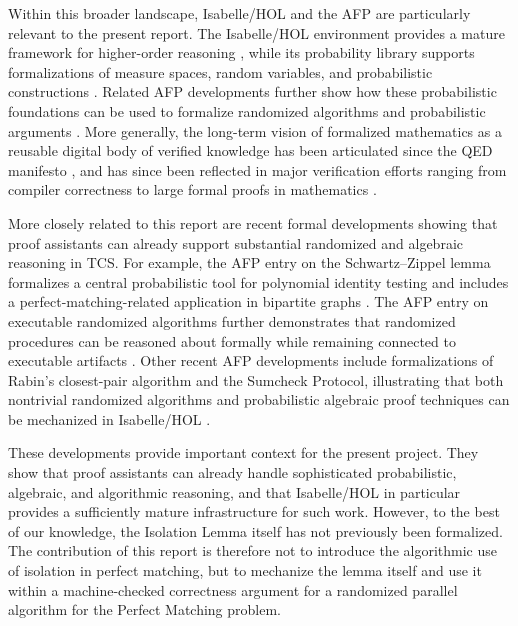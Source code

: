 Within this broader landscape, Isabelle/HOL and the AFP are particularly relevant to the present report.
The Isabelle/HOL environment provides a mature framework for higher-order reasoning \cite{nipkow2002isabelle}, while its probability library supports formalizations of measure spaces, random variables, and probabilistic constructions \cite{isabelleprob}. 
Related AFP developments further show how these probabilistic foundations can be used to formalize randomized algorithms and probabilistic arguments \cite{Executable_Randomized_Algorithms-AFP}.
More generally, the long-term vision of formalized mathematics as a reusable digital body of verified knowledge has been articulated since the QED manifesto \cite{qed1994}, and has since been reflected in major verification efforts ranging from compiler correctness to large formal proofs in mathematics \cite{leroy2009compcert,gonthier2005fourcolour}.

More closely related to this report are recent formal developments showing that proof assistants can already support substantial randomized and algebraic reasoning in TCS.
For example, the AFP entry on the Schwartz--Zippel lemma formalizes a central probabilistic tool for polynomial identity testing and includes a perfect-matching-related application in bipartite graphs \cite{Schwartz_Zippel-AFP}.
The AFP entry on executable randomized algorithms further demonstrates that randomized procedures can be reasoned about formally while remaining connected to executable artifacts \cite{Executable_Randomized_Algorithms-AFP}.
Other recent AFP developments include formalizations of Rabin's closest-pair algorithm and the Sumcheck Protocol, illustrating that both nontrivial randomized algorithms and probabilistic algebraic proof techniques can be mechanized in Isabelle/HOL \cite{Randomized_Closest_Pair-AFP,Sumcheck_Protocol-AFP}.

These developments provide important context for the present project.
They show that proof assistants can already handle sophisticated probabilistic, algebraic, and algorithmic reasoning, and that Isabelle/HOL in particular provides a sufficiently mature infrastructure for such work.
However, to the best of our knowledge, the Isolation Lemma itself has not previously been formalized.
The contribution of this report is therefore not to introduce the algorithmic use of isolation in perfect matching, but to mechanize the lemma itself and use it within a machine-checked correctness argument for a randomized parallel algorithm for the Perfect Matching problem.